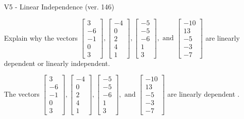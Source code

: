 \begin{exercise}
  \begin{exerciseTitle}V5 - Linear Independence (ver. 146)\end{exerciseTitle}
  \begin{exerciseStatement}
    Explain why the vectors \(\left[\begin{array}{r}
3 \\
-6 \\
-1 \\
0 \\
3
\end{array}\right] , \left[\begin{array}{r}
-4 \\
0 \\
2 \\
4 \\
1
\end{array}\right] , \left[\begin{array}{r}
-5 \\
-5 \\
-6 \\
1 \\
3
\end{array}\right] , \text{ and } \left[\begin{array}{r}
-10 \\
13 \\
-5 \\
-3 \\
-7
\end{array}\right]\) are linearly dependent or linearly independent.	


  \end{exerciseStatement}
  \begin{exerciseAnswer}
   The vectors \(\left[\begin{array}{r}
3 \\
-6 \\
-1 \\
0 \\
3
\end{array}\right] , \left[\begin{array}{r}
-4 \\
0 \\
2 \\
4 \\
1
\end{array}\right] , \left[\begin{array}{r}
-5 \\
-5 \\
-6 \\
1 \\
3
\end{array}\right] , \text{ and } \left[\begin{array}{r}
-10 \\
13 \\
-5 \\
-3 \\
-7
\end{array}\right]\) are 
  	 linearly dependent  .
  


  \end{exerciseAnswer}
\end{exercise}